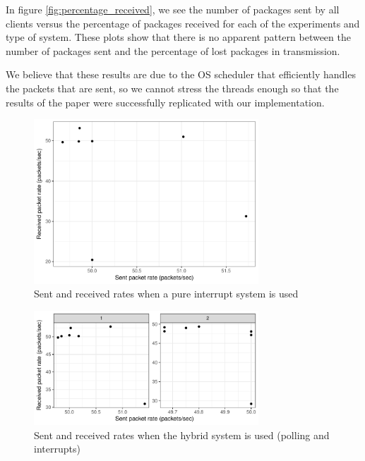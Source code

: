 \documentclass{article}
\begin{document}
In figure \ref{fig:percentage_received}, we see the number of packages sent by all clients versus the percentage of packages received for each of the experiments and type of system. These plots show that there is no apparent pattern between the number of packages sent and the percentage of lost packages in transmission.

We believe that these results are due to the OS scheduler that efficiently handles the packets that are sent, so we cannot stress the threads enough so that the results of the paper were successfully replicated with our implementation.

\begin{figure}[H]
    \centering
    \includegraphics[width=0.75\textwidth]{interrupt_rates.pdf}
    \caption{Sent and received rates when a pure interrupt system is used}
    \label{fig:interrupt_rates}
\end{figure}


\begin{figure}[H]
    \centering
    \includegraphics[width=0.75\textwidth]{polling_rates.pdf}
    \caption{Sent and received rates when the hybrid system is used (polling and interrupts)}
    \label{fig:polling_rates}
\end{figure}
\end{document}
